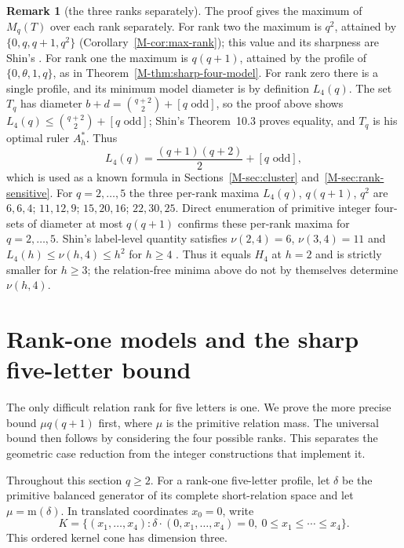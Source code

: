 \documentclass[11pt,reqno]{amsart}
\theoremstyle{plain}
\theoremstyle{definition}
\newtheorem{remark}[theorem]{Remark}
\theoremstyle{plain}
\newcommand{\mass}{\mathrm{m}}
\theoremstyle{plain}
\theoremstyle{plain}
\theoremstyle{plain}
\theoremstyle{plain}
\theoremstyle{plain}
\theoremstyle{definition}
\theoremstyle{definition}
\theoremstyle{definition}
\theoremstyle{plain}
\begin{document}
\begin{remark}[the three ranks separately]\label{M-rem:four-ranks}
The proof gives the maximum of $M_q(T)$ over each rank separately. For rank
two the maximum is $q^2$, attained by $\{0,q,q+1,q^2\}$
(Corollary~\ref{M-cor:max-rank}); this value and its sharpness are Shin's
\cite[Corollary~7.3, Lemma~3.1, Proposition~10.6]{M-Shin26}. For rank one the
maximum is $q(q+1)$, attained by the profile of $\{0,\theta,1,q\}$, as in
Theorem~\ref{M-thm:sharp-four-model}. For rank zero there is a single profile, and its minimum model diameter
is by definition $L_4(q)$. The set $T_q$ has diameter
$b+d=\binom{q+2}{2}+[q\text{ odd}]$, so the proof above shows
$L_4(q)\le\binom{q+2}{2}+[q\text{ odd}]$; Shin's Theorem~10.3
\cite{M-Shin26} proves equality, and $T_q$ is his optimal ruler $A_h^{*}$. Thus
\[
 L_4(q)=\frac{(q+1)(q+2)}2+[q\text{ odd}],
\]
which is used as a known formula in Sections~\ref{M-sec:cluster}
and~\ref{M-sec:rank-sensitive}. For $q=2,\ldots,5$ the three per-rank maxima
$L_4(q)$, $q(q+1)$, $q^2$ are $6,6,4$; $11,12,9$; $15,20,16$; $22,30,25$.
Direct enumeration of primitive integer four-sets of diameter at most
$q(q+1)$ confirms these per-rank maxima for $q=2,\ldots,5$.
Shin's label-level quantity satisfies
$\nu(2,4)=6$, $\nu(3,4)=11$ and
$L_4(h)\le\nu(h,4)\le h^2$ for $h\ge4$
\cite[Corollary~10.5]{M-Shin26}. Thus it equals $H_4$ at $h=2$ and is
strictly smaller for $h\ge3$; the relation-free minima above do not by
themselves determine $\nu(h,4)$.
\end{remark}

\section{Rank-one models and the sharp five-letter bound}\label{M-sec:five}

The only difficult relation rank for five letters is one. We prove the
more precise bound $\mu q(q+1)$ first, where $\mu$ is the primitive
relation mass. The universal bound then follows by considering the four
possible ranks. This separates the geometric case reduction from the
integer constructions that implement it.

Throughout this section $q\ge2$. For a rank-one five-letter profile,
let $\delta$ be the primitive balanced generator of its complete
short-relation space and let $\mu=\mass(\delta)$. In translated
coordinates $x_0=0$, write
\[
 K=\{(x_1,\ldots,x_4):\delta\cdot(0,x_1,\ldots,x_4)=0,
                    \ 0\le x_1\le\cdots\le x_4\}.
\]
This ordered kernel cone has dimension three.
\end{document}
